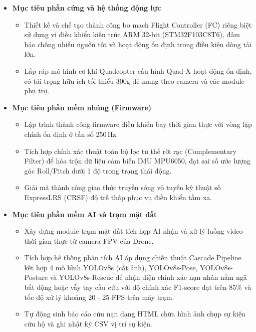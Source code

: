\begin{itemize}
    \item \textbf{Mục tiêu phần cứng và hệ thống động lực}
    \begin{itemize}
        \item Thiết kế và chế tạo thành công bo mạch Flight Controller (FC) riêng biệt sử dụng vi điều khiển kiến trúc ARM 32-bit (STM32F103C8T6), đảm bảo chống nhiễu nguồn tốt và hoạt động ổn định trong điều kiện dòng tải lớn.
        \item Lắp ráp mô hình cơ khí Quadcopter cấu hình Quad-X hoạt động ổn định, có tải trọng hữu ích tối thiểu 300g để mang theo camera và các module phụ trợ.
    \end{itemize}

    \item \textbf{Mục tiêu phần mềm nhúng (Firmware)}
    \begin{itemize}
        \item Lập trình thành công firmware điều khiển bay thời gian thực với vòng lặp chính ổn định ở tần số 250\,Hz.
        \item Tích hợp chính xác thuật toán bộ lọc tư thế rời rạc (Complementary Filter) để hòa trộn dữ liệu cảm biến IMU MPU6050, đạt sai số ước lượng góc Roll/Pitch dưới 1 độ trong trạng thái động.
        \item Giải mã thành công giao thức truyền sóng vô tuyến kỹ thuật số ExpressLRS (CRSF) độ trễ thấp phục vụ điều khiển tầm xa.
    \end{itemize}

    \item \textbf{Mục tiêu phần mềm AI và trạm mặt đất}
    \begin{itemize}
        \item Xây dựng module trạm mặt đất tích hợp AI nhận và xử lý luồng video thời gian thực từ camera FPV của Drone.
        \item Tích hợp hệ thống phân tích AI áp dụng chiến thuật Cascade Pipeline kết hợp 4 mô hình YOLOv8s (cắt ảnh), YOLOv8s-Pose, YOLOv8s-Posture và YOLOv8s-Rescue để nhận diện chính xác nạn nhân nằm ngã bất động hoặc vẫy tay cầu cứu với độ chính xác F1-score đạt trên 85\% và tốc độ xử lý khoảng 20 - 25 FPS trên máy trạm.
        \item Tự động sinh báo cáo cứu nạn dạng HTML chứa hình ảnh chụp sự kiện cứu hộ và ghi nhật ký CSV vị trí sự kiện.
    \end{itemize}
\end{itemize}

